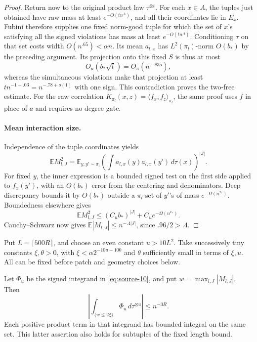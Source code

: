 \begin{proof}
Return now to the original product law \(\tau^{\otimes t}\). For each \(x\in A\), the tuples just obtained have raw mass at least \(e^{-O(tn^{.4})}\), and all their coordinates lie in \(E_x\). Fubini therefore supplies one fixed norm-good tuple for which the set of \(x\)'s satisfying all the signed violations has mass at least \(e^{-O(tn^{.4})}\). Conditioning \(\tau\) on that set costs width \(O(n^{.65})<\alpha n\). Its mean \(a_{l,x}\) has \(L^2(\pi_l)\)-norm \(O(b_*)\) by the preceding argument. Its projection onto this fixed \(S\) is thus at most
\[
 O_u(b_*\sqrt t)=O_u(n^{-.835}),
\]
whereas the simultaneous violations make that projection at least
\(t n^{-1-.03}=n^{-.78+o(1)}\) with one sign. This contradiction proves the two-free estimate. For the raw correlation \(K_{\pi_l}(x,z)=\langle f_x,f_z\rangle_{\pi_l}\), the same proof uses \(f\) in place of \(a\) and requires no degree gate.

\paragraph{Mean interaction size.}
Independence of the tuple coordinates yields
\[
 \mathbb E M_{l,J}^2
 =\mathbb E_{y,y'\sim\pi_l}
   \left(\int a_{l,x}(y)a_{l,x}(y')\,d\tau(x)\right)^{|J|}.
\]
For fixed \(y\), the inner expression is a bounded signed test on the first side applied to \(f_x(y')\), with an \(O(b_*)\) error from the centering and denominators. Deep discrepancy bounds it by \(O(b_*)\) outside a \(\pi_l\)-set of \(y'\)'s of mass \(e^{-\Omega(n^{x_*})}\). Boundedness elsewhere gives
\[
 \mathbb E M_{l,J}^2\le (C_u b_*)^{|J|}
             +C_u e^{-\Omega(n^{x_*})}.
\]
Cauchy--Schwarz now gives \(\mathbb E|M_{l,J}|\le n^{-.4|J|}\), since \(.96/2>.4\).
\end{proof}

Put \(L=\lceil500R\rceil\), and choose an even constant \(u>10L^2\). Take successively tiny constants \(\xi,\theta>0\), with \(\xi<\alpha 2^{-10u-100}\) and \(\theta\) sufficiently small in terms of \(\xi,u\). All can be fixed before patch and geometry choices below.

\begin{lemma}\label{lem:moderate-interaction-moment}
Let \(\Phi_u\) be the signed integrand in \eqref{eq:source-10}, and put \(w=\max_{l,J}|M_{l,J}|\). Then
\[
 \left|\int_{\{w\le2\xi\}}\Phi_u\,d\tau^{\otimes u}\right|\le n^{-3R}.
\]
Each positive product term in that integrand has bounded integral on the same set. This latter assertion also holds for subtuples of the fixed length bound.
\end{lemma}

